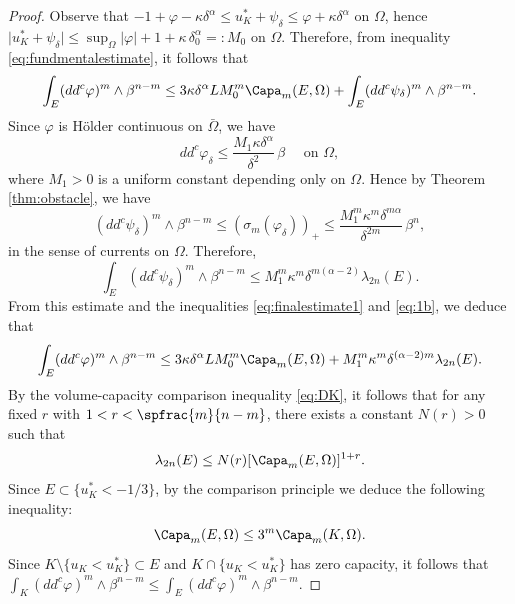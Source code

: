 \begin{proof}
Observe that $-1 + \varphi - \kappa \delta^\alpha \leq u_K^* + \psi_\delta \leq \varphi + \kappa \delta^\alpha$ on $\Omega$, hence $\vert u_K^* + \psi_\delta\vert \leq \sup_{\Omega} \vert \varphi\vert + 1 + \kappa \, \delta_0^\alpha =: M_0$ on $\Omega$. Therefore, from inequality \eqref{eq:fundmentalestimate}, it follows that
\begin{equation} \label{eq:finalestimate1}
\int_{E}(dd^c\varphi)^m\wedge\beta^{n-m} \leq 3 \kappa \delta^\alpha L M_0^m \Capa_m (E,\Omega) + \int_{E}(dd^c\psi_{\delta})^m\wedge\beta^{n-m}.
\end{equation}
Since $\varphi$ is Hölder continuous on $\bar \Omega$, we have
\begin{equation}\label{eq:1a}
dd^c\varphi_{\delta}\leq\frac{M_1 \kappa \delta^\alpha}{\delta^{2}}\, \beta \quad\text{ on } \Omega,
\end{equation}
where $M_1 > 0$ is a uniform constant depending only on $\Omega$. Hence by Theorem \ref{thm:obstacle}, we have
\begin{equation}\label{eq:1b}
(dd^c\psi_{\delta})^m\wedge\beta^{n-m} \leq (\sigma_m (\varphi_{\delta}))_+ \leq\frac{M_1^m \kappa^m \delta^{m \alpha}}{\delta^{2 m}}\, \beta^n,
\end{equation}
in the sense of currents on $ \Omega$. Therefore,
\[
\int_{E}(dd^c\psi_{\delta})^m\wedge\beta^{n-m}\leq M_1^{m} \kappa^m \delta^{ m (\alpha -2)} \lambda_{2 n} (E).
\]
From this estimate and the inequalities \eqref{eq:finalestimate1} and \eqref{eq:1b}, we deduce that
\begin{equation} \label{eq:finalestimate2}
\int_{E}(dd^c\varphi)^m\wedge\beta^{n-m} \leq 3 \kappa \delta^{\alpha} L M_0^m \Capa_m (E,\Omega)+ M_1^{m} \kappa^m \delta^{(\alpha -2)m} \lambda_{2 n} (E).
\end{equation}
By the volume-capacity comparison inequality \eqref{eq:DK}, it follows that for any fixed $r$ with $1 < r < \spfrac{m}{n - m}$, there exists a constant $N (r) > 0$ such that
\begin{equation} \label{eq:volumeestimate}
\lambda_{2 n}(E) \leq N (r) [\Capa_m(E,\Omega)]^{1 + r}.
\end{equation}
Since $ E \subset\{u_K^* < - 1 \slash 3\}$, by the comparison principle we deduce the following inequality:
\begin{equation}\label{eq:2}
\Capa_m (E,\Omega) \leq 3^{m} \Capa_m (K,\Omega).
\end{equation}
Since $K \setminus \{u_K < u_K^*\} \subset E$ and $K \cap \{u_K < u_K^*\}$ has zero capacity, it follows that $\int_K (dd^c\varphi)^m\wedge\beta^{n-m} \leq \int_E (dd^c\varphi)^m\wedge\beta^{n-m}$.


\end{proof}
